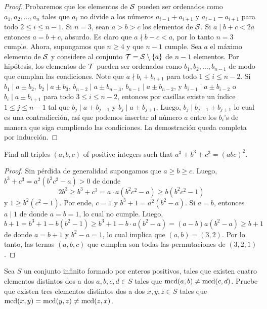 \begin{proof}
  Probaremos que los elementos de $\cal S$ pueden ser ordenados como
  $a_1,a_2,\dots,a_n$ tales que $a_i$ no divide a los números $a_{i-1}+a_{i+1}$
  y $a_{i-1}-a_{i+1}$ para todo $2\le i\le n-1$. Si $n=3$, sean $a>b>c$ los
  elementos de $\cal S$. Si $a\mid b+c<2a$ entonces $a=b+c$, absurdo. Es claro
  que $a\nmid b-c<a$, por lo tanto $n=3$ cumple. Ahora, supongamos que $n\ge 4$
  y que $n-1$ cumple. Sea $a$ el máximo elemento de $\cal S$ y considere al
  conjunto ${\cal T}={\cal S}\setminus\{a\}$ de $n-1$ elementos. Por hipótesis,
  los elementos de $\cal T$ pueden ser ordenados como $b_1,b_2,\dots,b_{n-1}$ de
  modo que cumplan las condiciones. Note que $a\nmid b_i+b_{i+1}$ para todo
  $1\le i\le n-2$. Si $b_1\mid a\pm b_2$, $b_2\mid a\pm b_3$,
  $b_{n-2}\mid a\pm b_{n-3}$, $b_{n-1}\mid a\pm b_{n-2}$, y
  $b_{i-1}\mid a\pm b_{i-2}$ o $b_i\mid a\pm b_{i+1}$ para todo $3\le i\le n-2$,
  entonces por casillas existe un índice $1\le j\le n-1$ tal que
  $b_j\mid a\pm b_{j-1}$ y $b_j\mid a\pm b_{j+1}$. Luego,
  $b_j\mid b_{j-1}\pm b_{j+1}$ lo cual es una contradicción, así que podemos
  insertar al número $a$ entre los $b_i$'s de manera que siga cumpliendo las
  condiciones. La demostración queda completa por inducción.
\end{proof}

\begin{probEG}[ISL 2019/N2]
  Find all triples $(a,b,c)$ of positive integers such that
  $a^3+b^3+c^3=(abc)^2$.
\end{probEG}

\begin{proof}
  Sin pérdida de generalidad supongamos que $a\ge b\ge c$. Luego,
  $b^3+c^3=a^2(b^2c^2-a)>0$ de donde
  \[2b^3\ge b^3+c^3=a\cdot a(b^2c^2-a)\ge b(b^2c^2-1)\]
  y $1\ge b^2(c^2-1)$. Por ende, $c=1$ y $b^3+1=a^2(b^2-a)$. Si $a=b$, entonces
  $a\mid 1$ de donde $a=b=1$, lo cual no cumple. Luego,
  \[b+1=b^3+1-b(b^2-1)\ge b^3+1-b\cdot a(b^2-a)=(a-b)a(b^2-a)\ge b+1\]
  de donde $a=b+1$ y $b^2-a=1$, lo cual implica que $(a,b)=(3,2)$. Por lo tanto,
  las ternas $(a,b,c)$ que cumplen son todas las permutaciones de $(3,2,1)$.
\end{proof}


\begin{probEG}
  Sea $S$ un conjunto infinito formado por enteros positivos, tales que existen
  cuatro elementos distintos dos a dos $a,b,c,d\in S$ tales que
  $\operatorname{mcd}(a,b)\ne\operatorname{mcd}(c,d)$. Pruebe que existen tres elementos distintos dos a dos
  $x,y,z\in S$ tales que $\operatorname{mcd}(x,y)=\operatorname{mcd}(y,z)\ne\operatorname{mcd}(z,x)$.
\end{probEG}

